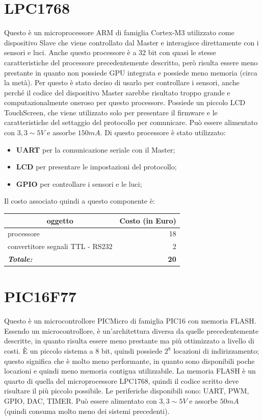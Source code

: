 \documentclass[a4paper,titlepage]{book}
\newcommand{\itema}{\begin{itemize}[noitemsep,topsep=10pt,parsep=23pt,partopsep=0pt]}
\begin{document}
\section{LPC1768}



Questo è un microprocessore ARM di famiglia Cortex-M3 utilizzato come dispositivo Slave che viene controllato dal Master e interagisce direttamente con i sensori e luci. Anche questo processore è a 32 bit con quasi le stesse caratteristiche del processore precedentemente descritto, però risulta essere meno prestante in quanto non possiede GPU integrata e possiede meno memoria (circa la metà). Per questo è stato deciso di usarlo per controllare i sensori, anche perché il codice del dispositivo Master sarebbe risultato troppo grande e computazionalmente oneroso per questo processore. Possiede un piccolo LCD TouchScreen, che viene utilizzato solo per presentare il firmware e le caratteristiche del settaggio del protocollo per comunicare. Può essere alimentato con $3,3 \sim 5 V$ e assorbe $150 mA$. Di questo processore è stato utilizzato:

\itema

\item \textbf{UART} per la comunicazione seriale con il Master;
\item \textbf{LCD} per presentare le impostazioni del protocollo;
\item \textbf{GPIO} per controllare i sensori e le luci;
\end{itemize}

Il costo associato quindi a questo componente è:

\begin{tabular}{|l  r|}
\hline
\multicolumn{1}{|c|}{\textbf {oggetto}} & \multicolumn{1}{c|}{\textbf {Costo (in Euro)}} \\
\hline

processore 				& 18 \\
convertitore segnali TTL - RS232 	&  2  \\
\hline
\hline

\textit{\textbf{Totale:}}		& \textbf{20} \\

\hline
\end{tabular}

\section{PIC16F77}


Questo è un microcontrollore PICMicro di famiglia PIC16 con memoria FLASH. Essendo un microcontrollore, è un'architettura diversa da quelle precedentemente descritte, in quanto risulta essere meno prestante ma più ottimizzato a livello di costi. È un piccolo sistema a 8 bit, quindi possiede $2^8$ locazioni di indirizzamento; questo significa che è molto meno performante, in quanto sono disponibili poche locazioni e quindi meno memoria contigua utilizzabile. La memoria FLASH è un quarto di quella del microprocessore LPC1768, quindi il codice scritto deve risultare il più piccolo possibile. Le periferiche disponibili sono: UART, PWM, GPIO, DAC, TIMER. Può essere alimentato con $3,3 \sim 5 V$ e assorbe $50 mA$ (quindi consuma molto meno dei sistemi precedenti).
\end{document}
